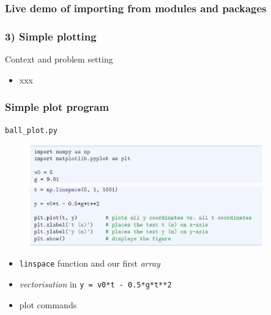 \documentclass[14pt]{beamer}
\newcommand\red[1]{{\color{red} #1}}
\begin{document}

\begin{frame}[fragile]
\frametitle{Live demo of importing from modules and packages}

\end{frame}


\begin{frame}[fragile]
\frametitle{3) Simple plotting}

Context and problem setting


\begin{itemize}
\item xxx
\end{itemize}

\end{frame}


\begin{frame}[fragile]
\frametitle{Simple plot program}

\vspace*{-6mm}
\begin{center}
{\small
\texttt{ball\_plot.py}
}
\end{center}
\vspace*{-8mm}
\begin{figure}[ht]
	\centering
	\includegraphics[width=0.9\textwidth]{figures/LLp19}
	\includegraphics[width=0.9\textwidth]{figures/LLp20a}
\end{figure}
\vspace*{-8mm}
\begin{itemize}
\item \texttt{linspace} function and our first \red{\emph{array}}
\item \red{\emph{vectorisation}} in \texttt{y = v0*t - 0.5*g*t**2}
\item plot commands
\end{itemize}

\end{frame}
\end{document}
